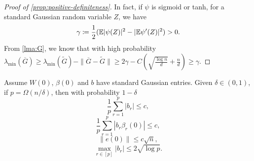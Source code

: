 \begin{proof}[Proof of \cref{prop:positive-definiteness}]
In fact, if $\psi$ is sigmoid or tanh, for a standard Gaussian random variable $Z$, we have
\begin{equation*}
    \gamma\coloneqq \frac{1}{2}(\mathbb{E}|\psi(Z)|^2-|\mathbb{E}\psi'(Z)|^2) >0.
\end{equation*}
From \cref{lma:G}, we know that with high probability $\lambda_{\min}(\overline{G}) \geq \lambda_{\min}(\widetilde{G})-\|\overline{G}-\widetilde{G}\|\geq 2\gamma - C(\sqrt{\frac{\log n}{d}} + \frac{n}{d}) \geq \gamma$.
\end{proof}

\begin{lemma}
\label{lma:inqs}
Assume $W(0)$, $\beta(0)$ and $b$ have \iid standard Gaussian entries. Given $\delta\in(0,1)$, if $p=\Omega(n/\delta)$, then with probability $1-\delta$
\begin{equation}\label{eq:sumb_bd}
    \frac{1}{p}\sum_{r=1}^p|b_r| \leq c,
\end{equation}
\begin{equation}\label{eq:sumbbet_bd}
    \frac{1}{p}\sum_{r=1}^p|b_r\beta_r(0)| \leq c,
\end{equation}
\begin{equation}\label{eq:e0_bd}
    \|e(0)\| \leq c\sqrt n,
\end{equation}
\begin{equation}\label{eq:maxb_bd}
    \max_{r\in[p]}|b_r|\leq 2\sqrt{\log p}.
\end{equation}
\end{lemma}
